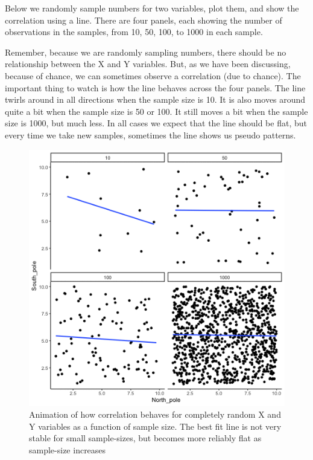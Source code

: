 \documentclass[]{book}
\begin{document}
Below we randomly sample numbers for two variables, plot them, and show the correlation using a line. There are four panels, each showing the number of observations in the samples, from 10, 50, 100, to 1000 in each sample.

Remember, because we are randomly sampling numbers, there should be no relationship between the X and Y variables. But, as we have been discussing, because of chance, we can sometimes observe a correlation (due to chance). The important thing to watch is how the line behaves across the four panels. The line twirls around in all directions when the sample size is 10. It is also moves around quite a bit when the sample size is 50 or 100. It still moves a bit when the sample size is 1000, but much less. In all cases we expect that the line should be flat, but every time we take new samples, sometimes the line shows us pseudo patterns.

\begin{figure}
\centering
\includegraphics{gifs/corUnifFourNs-1.gif}
\caption{\label{fig:3corRandfour}Animation of how correlation behaves for completely random X and Y variables as a function of sample size. The best fit line is not very stable for small sample-sizes, but becomes more reliably flat as sample-size increases}
\end{figure}
\end{document}
